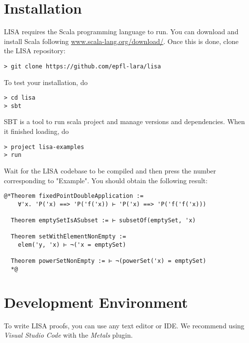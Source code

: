 \section{Installation}
LISA requires the Scala programming language to run. You can download and install Scala following \url{www.scala-lang.org/download/}. Once this is done, clone the LISA repository:
\begin{lstlisting}[language=console]
> git clone https://github.com/epfl-lara/lisa
\end{lstlisting}
To test your installation, do
\begin{lstlisting}[language=console]
> cd lisa
> sbt
\end{lstlisting}
SBT is a tool to run scala project and manage versions and dependencies. When it finished loading, do
\begin{lstlisting}[language=console]
> project lisa-examples
> run
\end{lstlisting}
Wait for the LISA codebase to be compiled and then press the number corresponding to "Example". You should obtain the following result:
\noindent\begin{minipage}{\linewidth}\vspace{1em}
\begin{lstlisting}[language=console]
  @*Theorem fixedPointDoubleApplication := 
    ∀'x. 'P('x) ==> 'P('f('x)) ⊢ 'P('x) ==> 'P('f('f('x)))

  Theorem emptySetIsASubset := ⊢ subsetOf(emptySet, 'x)

  Theorem setWithElementNonEmpty := 
    elem('y, 'x) ⊢ ¬('x = emptySet)

  Theorem powerSetNonEmpty := ⊢ ¬(powerSet('x) = emptySet)
  *@
\end{lstlisting}
\end{minipage}



\section{Development Environment}
To write LISA proofs, you can use any text editor or IDE. We recommend using \emph{Visual Studio Code} with the \emph{Metals} plugin.

